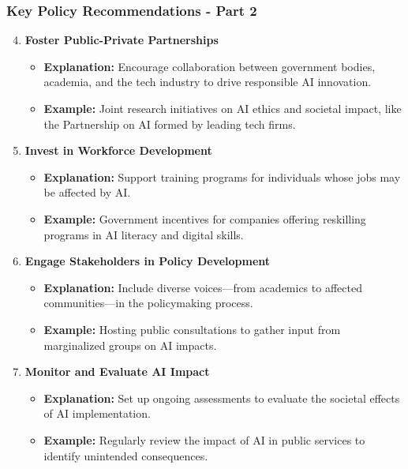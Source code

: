 \documentclass[aspectratio=169]{beamer}
\begin{document}
\begin{frame}[fragile]
    \frametitle{Key Policy Recommendations - Part 2}

    \begin{enumerate}
        \setcounter{enumi}{3} %
        \item \textbf{Foster Public-Private Partnerships}
        \begin{itemize}
            \item \textbf{Explanation:} Encourage collaboration between government bodies, academia, and the tech industry to drive responsible AI innovation.
            \item \textbf{Example:} Joint research initiatives on AI ethics and societal impact, like the Partnership on AI formed by leading tech firms.
        \end{itemize}

        \item \textbf{Invest in Workforce Development}
        \begin{itemize}
            \item \textbf{Explanation:} Support training programs for individuals whose jobs may be affected by AI.
            \item \textbf{Example:} Government incentives for companies offering reskilling programs in AI literacy and digital skills.
        \end{itemize}

        \item \textbf{Engage Stakeholders in Policy Development}
        \begin{itemize}
            \item \textbf{Explanation:} Include diverse voices—from academics to affected communities—in the policymaking process.
            \item \textbf{Example:} Hosting public consultations to gather input from marginalized groups on AI impacts.
        \end{itemize}

        \item \textbf{Monitor and Evaluate AI Impact}
        \begin{itemize}
            \item \textbf{Explanation:} Set up ongoing assessments to evaluate the societal effects of AI implementation.
            \item \textbf{Example:} Regularly review the impact of AI in public services to identify unintended consequences.
        \end{itemize}
    \end{enumerate}
\end{frame}
\end{document}
